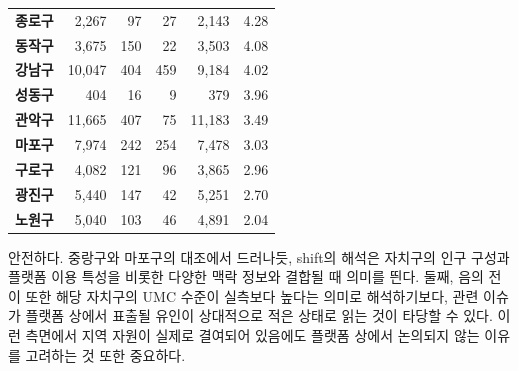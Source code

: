 \begin{table}[htbp]
\begin{tabularx}{\textwidth}{l r r r r r}
    \textbf{종로구}   & 2,267  & 97  & 27  & 2,143  & 4.28 \\
    \textbf{동작구}   & 3,675  & 150 & 22  & 3,503  & 4.08 \\
    \textbf{강남구}   & 10,047 & 404 & 459 & 9,184  & 4.02 \\
    \textbf{성동구}   & 404    & 16  & 9   & 379    & 3.96 \\
    \textbf{관악구}   & 11,665 & 407 & 75  & 11,183 & 3.49 \\
    \textbf{마포구}   & 7,974  & 242 & 254 & 7,478  & 3.03 \\
    \textbf{구로구}   & 4,082  & 121 & 96  & 3,865  & 2.96 \\
    \textbf{광진구}   & 5,440  & 147 & 42  & 5,251  & 2.70 \\
    \textbf{노원구}   & 5,040  & 103 & 46  & 4,891  & 2.04 \\
    \bottomrule
  \end{tabularx}
\end{table}


안전하다. 중랑구와 마포구의 대조에서 드러나듯, shift의 해석은 자치구의 인구 구성과 플랫폼 이용 특성을 비롯한 다양한 맥락 정보와 결합될 때 의미를 띈다. 둘째, 음의 전이 또한 해당 자치구의 UMC 수준이 실측보다 높다는 의미로 해석하기보다, 관련 이슈가 플랫폼 상에서 표출될 유인이 상대적으로 적은 상태로 읽는 것이 타당할 수 있다. 이런 측면에서 지역 자원이 실제로 결여되어 있음에도 플랫폼 상에서 논의되지 않는 이유를 고려하는 것 또한 중요하다.

